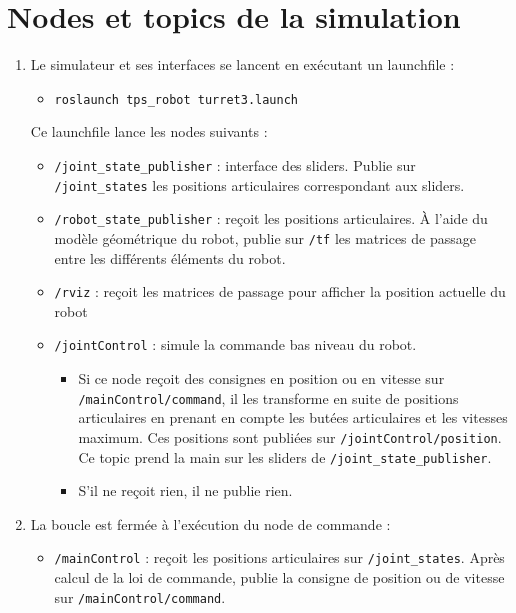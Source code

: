\documentclass[12pt,a4paper]{article}
\begin{document}
\section{Nodes et topics de la simulation}
\label{sec:nodes}
\begin{enumerate}
\item Le simulateur et ses interfaces se lancent en exécutant un launchfile :
\begin{itemize}
\item \texttt{roslaunch tps\_robot turret3.launch}
\end{itemize}
 Ce launchfile lance les nodes suivants :
\begin{itemize}
\item \texttt{/joint\_state\_publisher} : interface des sliders. Publie sur \texttt{/joint\_states} les positions articulaires correspondant aux sliders.
\item \texttt{/robot\_state\_publisher} : reçoit les positions articulaires. À l'aide du modèle géométrique du robot, publie sur \texttt{/tf} les  matrices de passage entre les différents éléments du robot.
\item \texttt{/rviz} : reçoit les matrices de passage pour afficher la position actuelle du robot
\item \texttt{/jointControl} : simule la commande bas niveau du robot.
\begin{itemize}
\item Si ce node reçoit des consignes en position ou en vitesse sur \texttt{/mainControl/command}, il les transforme en suite de positions articulaires en prenant en compte les butées articulaires et les vitesses maximum. Ces positions sont publiées sur \texttt{/jointControl/position}. Ce topic prend la main sur les sliders de \texttt{/joint\_state\_publisher}.
\item S'il ne reçoit rien, il ne publie rien.
\end{itemize}
\end{itemize}
\item La boucle est fermée à l'exécution du node de commande :
\begin{itemize}
\item \texttt{/mainControl} : reçoit les positions articulaires sur \texttt{/joint\_states}. Après calcul de la loi de commande, publie la consigne de position ou de vitesse sur \texttt{/mainControl/command}.
\end{itemize}

\end{enumerate}
\end{document}
